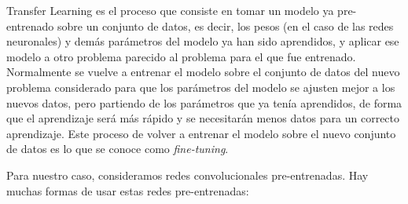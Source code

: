 \documentclass[a4paper,11pt]{article}
\begin{document}
Transfer Learning es el proceso que consiste en tomar un modelo ya pre-entrenado sobre un conjunto de datos, es decir, los pesos (en el caso de las redes neuronales) y demás parámetros del modelo ya han sido aprendidos, y aplicar ese modelo a otro problema parecido al problema para el que fue entrenado. Normalmente se vuelve a entrenar el modelo sobre el conjunto de datos del nuevo problema considerado para que los parámetros del modelo se ajusten mejor a los nuevos datos, pero partiendo de los parámetros que ya tenía aprendidos, de forma que el aprendizaje será más rápido y se necesitarán menos datos para un correcto aprendizaje. Este proceso de volver a entrenar el modelo sobre el nuevo conjunto de datos es lo que se conoce como \textit{fine-tuning}. 


 Para nuestro caso, consideramos redes convolucionales pre-entrenadas. Hay muchas formas de usar estas redes pre-entrenadas:
\end{document}
